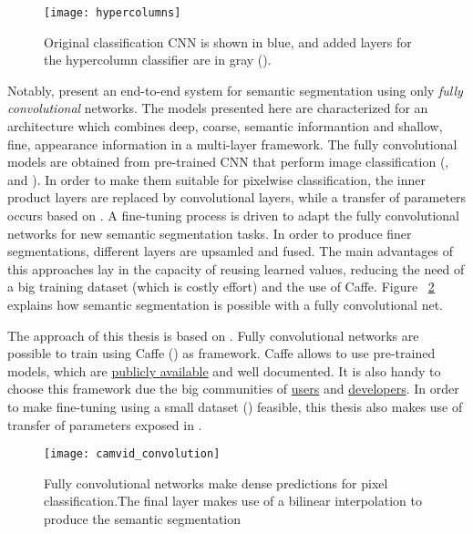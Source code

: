 \begin{figure}
 \centering
 \texttt{[image: hypercolumns]}
 \caption{Original classification CNN is shown in blue, and added layers for the hypercolumn classifier are in gray (\textcite{hariharan2014hypercolumns}).}
 \label{fig:hyper} 
\end{figure}


Notably, \textcite{long2014fully} present an end-to-end system for semantic segmentation using only \textit{fully convolutional} networks. The models presented here are characterized for an architecture which combines deep, coarse, semantic informantion and shallow, fine, appearance information in a multi-layer framework. The fully convolutional models are obtained from  pre-trained CNN that perform image classification (\textcite{Krizhevsky_imagenetclassification}, \textcite{szegedy2014going} and \textcite{simonyan2014very}). In order to make them suitable for pixelwise classification, the inner product layers are replaced by convolutional layers, while a transfer of parameters occurs based on \textcite{donahue2013decaf}. A fine-tuning process is driven to adapt the fully convolutional networks for new semantic segmentation tasks. In order to produce finer segmentations, different layers are upsamled and fused. The main advantages of this approaches lay in the capacity of reusing learned values, reducing the need of a big training dataset (which is costly effort) and the use of Caffe. Figure ~\ref{fig:fcn} explains how semantic segmentation is possible with a fully convolutional net.

The approach of this thesis is based on \textcite{long2014fully}. Fully convolutional networks are possible to train using Caffe (\textcite{jia2014caffe}) as framework. Caffe allows to use pre-trained models, which are \href{https://github.com/BVLC/caffe/wiki/Model-Zoo}{publicly available} and well documented. It is also handy to choose this framework due the big communities of \href{https://groups.google.com/forum/#!forum/caffe-users}{users} and \href{https://github.com/BVLC/caffe}{developers}.  In order to make fine-tuning using a small dataset (\textcite{BrostowFC:PRL2008}) feasible, this thesis also makes use of transfer of parameters exposed in \textcite{donahue2013decaf}.  

\begin{figure}
 \centering
 \texttt{[image: camvid\_convolution]}
 \caption{Fully convolutional networks make dense predictions for pixel classification.The final layer makes use of a bilinear interpolation to produce the semantic segmentation}
 \label{fig:fcn}
\end{figure}
   

